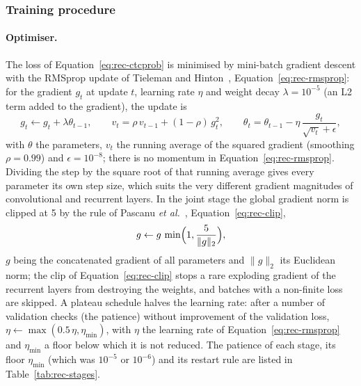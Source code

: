 \subsubsection{Training procedure}

\paragraph{Optimiser.}
The loss of Equation~\ref{eq:rec-ctcprob} is minimised by mini-batch gradient descent with the RMSprop update of Tieleman and Hinton~\cite{tieleman2012}, Equation~\ref{eq:rec-rmsprop}: for the gradient $g_t$ at update $t$, learning rate $\eta$ and weight decay $\lambda=10^{-5}$ (an L2 term added to the gradient), the update is
\begin{equation}
g_t\leftarrow g_t+\lambda\theta_{t-1},\qquad v_t=\rho\,v_{t-1}+(1-\rho)\,g_t^2,\qquad \theta_t=\theta_{t-1}-\eta\,\frac{g_t}{\sqrt{v_t}+\epsilon},
\label{eq:rec-rmsprop}
\end{equation}
with $\theta$ the parameters, $v_t$ the running average of the squared gradient (smoothing $\rho=0.99$) and $\epsilon=10^{-8}$; there is no momentum in Equation~\ref{eq:rec-rmsprop}.
Dividing the step by the square root of that running average gives every parameter its own step size, which suits the very different gradient magnitudes of convolutional and recurrent layers.
In the joint stage the global gradient norm is clipped at 5 by the rule of Pascanu \emph{et al.}~\cite{pascanu2013}, Equation~\ref{eq:rec-clip},
\begin{equation}
g\leftarrow g\,\min\Bigl(1,\frac{5}{\|g\|_2}\Bigr),
\label{eq:rec-clip}
\end{equation}
$g$ being the concatenated gradient of all parameters and $\|g\|_2$ its Euclidean norm; the clip of Equation~\ref{eq:rec-clip} stops a rare exploding gradient of the recurrent layers from destroying the weights, and batches with a non-finite loss are skipped.
A plateau schedule halves the learning rate: after a number of validation checks (the patience) without improvement of the validation loss, $\eta\leftarrow\max(0.5\,\eta,\eta_{\min})$, with $\eta$ the learning rate of Equation~\ref{eq:rec-rmsprop} and $\eta_{\min}$ a floor below which it is not reduced.
The patience of each stage, its floor $\eta_{\min}$ (which was $10^{-5}$ or $10^{-6}$) and its restart rule are listed in Table~\ref{tab:rec-stages}.


